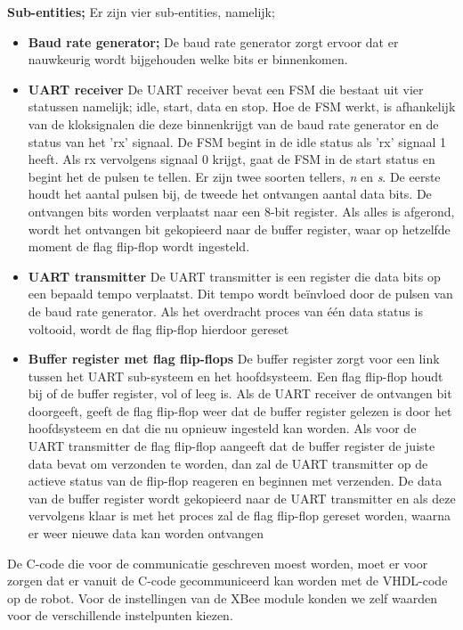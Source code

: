 \documentclass{report}
\begin{document}
\textbf{Sub-entities;}
\newline
Er zijn vier sub-entities, namelijk;
\begin{itemize}
\item  \textbf{Baud rate generator;}
\newline
De baud rate generator zorgt ervoor dat er nauwkeurig wordt bijgehouden welke bits er binnenkomen.

\item \textbf{UART receiver}
\newline 
De UART receiver bevat een FSM die bestaat uit vier statussen namelijk; idle, start, data en stop.
Hoe de FSM werkt, is afhankelijk van de kloksignalen die deze binnenkrijgt van de baud rate generator en de status van het 'rx' signaal.
De FSM begint in de idle status als 'rx' signaal 1 heeft. Als rx vervolgens signaal 0 krijgt, gaat de FSM in de start status en begint het de pulsen te tellen. Er zijn twee soorten tellers, \textit{n} en \textit{s}. De eerste houdt het aantal pulsen bij, de tweede het ontvangen aantal data bits. De ontvangen bits worden verplaatst naar een 8-bit register. Als alles is afgerond, wordt het ontvangen bit gekopieerd naar de buffer register, waar op hetzelfde moment de flag flip-flop wordt ingesteld.
 
 \item \textbf{UART transmitter}
 \newline
 De UART transmitter is een register die data bits op een bepaald tempo verplaatst. Dit tempo wordt beïnvloed door de pulsen van de baud rate generator. Als het overdracht proces van één data status is voltooid, wordt de flag flip-flop hierdoor gereset
 
 \item \textbf{Buffer register met flag flip-flops}
 \newline
 De buffer register zorgt voor een link tussen het UART sub-systeem en het hoofdsysteem. Een flag flip-flop houdt bij of de buffer register, vol of leeg is.
\newline
Als de UART receiver de ontvangen bit doorgeeft, geeft de flag flip-flop weer dat de buffer register gelezen is door het hoofdsysteem en dat die nu opnieuw ingesteld kan worden.
\newline
Als voor de UART transmitter de flag flip-flop aangeeft dat de buffer register de juiste data bevat om verzonden te worden, dan zal de UART transmitter op de actieve status van de flip-flop reageren en beginnen met verzenden. De data van de buffer register wordt gekopieerd naar de UART transmitter en als deze vervolgens klaar is met het proces zal de flag flip-flop gereset worden, waarna er weer nieuwe data kan worden ontvangen 
 
\end{itemize}
De C-code die voor de communicatie geschreven moest worden, moet er voor zorgen dat er vanuit de C-code gecommuniceerd kan worden met de VHDL-code op de robot.
\newline
Voor de instellingen van de XBee module konden we zelf waarden voor de verschillende instelpunten kiezen.
\end{document}
